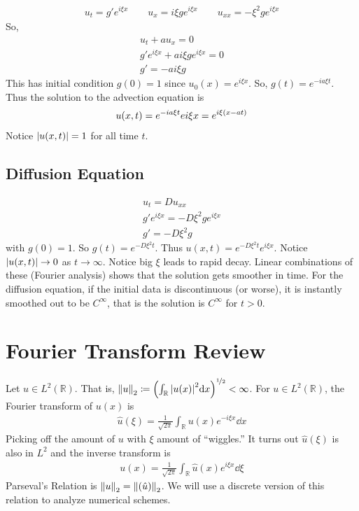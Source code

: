 \documentclass{article}
\newcommand{\Rl}{\mathbb{R}}
\begin{document}
            \begin{align*}
                u_t = g' e^{i\xi x} \qquad u_x = i\xi ge^{i\xi x} \qquad u_{xx} = -\xi^2 g e^{i\xi x}
            \end{align*}
            So,
            \begin{align*}
                u_t + au_x = 0 \\
                g'e^{i\xi x} + ai\xi ge^{i\xi x} = 0 \\
                g' = -ai\xi g
            \end{align*}
            This has initial condition $g(0) = 1$ since $u_0(x) = e^{i\xi x}$.  So, $g(t) = e^{-ia\xi t}$.  Thus the solution to the advection equation is
            \begin{align*}
                u(x,t) = e^{-ia\xi t}e{i\xi x} = e^{i\xi\qty(x - at)}
            \end{align*}
            Notice $\abs{u(x,t)} = 1$ for all time $t$.

        \subsection{Diffusion Equation}

            \begin{align*}
                u_t = Du_{xx} \\
                g'e^{i\xi x} = -D\xi^2ge^{i\xi x} \\
                g' = -D\xi^2g
            \end{align*}
            with $g(0) = 1$.  So $g(t) = e^{-D\xi^2t}$.  Thus $u(x,t) = e^{-D\xi^2t}e^{i\xi x}$.  Notice $\abs{u(x,t)} \rightarrow 0$ as $t \rightarrow \infty$.  Notice big $\xi$ leads to rapid decay.  Linear combinations of these (Fourier analysis) shows that the solution gets smoother in time.  For the diffusion equation, if the initial data is discontinuous (or worse), it is instantly smoothed out to be $C^\infty$, that is the solution is $C^\infty$ for $t > 0$.

    \section{Fourier Transform Review}

        Let $u \in L^2(\Rl)$.  That is, $\norm{u}_2 \coloneqq \qty(\int_\Rl\abs{u(x)}^2\dd x)^{\nicefrac{1}{2}} < \infty$.  For $u \in L^2(\Rl)$, the Fourier transform of $u(x)$ is
        \begin{align}
            \hat{u}(\xi) = \frac{1}{\sqrt{2\pi}}\int_\Rl u(x)e^{-i\xi x}\dd x
        \end{align}
        Picking off the amount of $u$ with $\xi$ amount of ``wiggles.''  It turns out $\hat{u}(\xi)$ is also in $L^2$ and the inverse transform is
        \begin{align}
            u(x) = \frac{1}{\sqrt{2\pi}}\int_\Rl \hat{u}(x)e^{i\xi x}\dd \xi
        \end{align}
        Parseval's Relation is $\norm{u}_2 = \norm{(\hat{u})}_2$.  We will use a discrete version of this relation to analyze numerical schemes.
\end{document}
